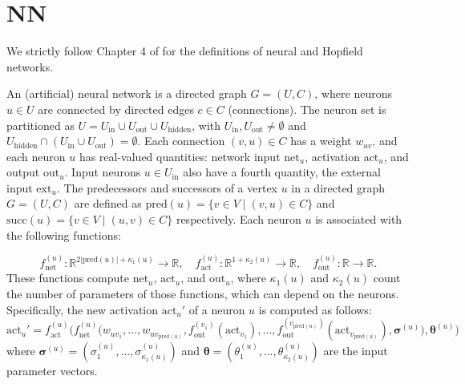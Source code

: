 \chapter{NN}

We strictly follow Chapter 4 of \cite{comp} for the definitions of neural and Hopfield networks.

\begin{definition}\label{NeuralNetwork}
An (artificial) neural network is a directed graph \( G = (U, C) \), where neurons \( u \in U \) 
are connected by directed edges \( c \in C \) (connections). 
The neuron set is partitioned as \( U = U_{\mathrm{in}} \cup U_{\mathrm{out}} \cup U_{\mathrm{hidden}} \), 
with \( U_{\mathrm{in}}, U_{\mathrm{out}} \neq \emptyset \) and \( U_{\mathrm{hidden}} \cap (U_{\mathrm{in}} 
\cup U_{\mathrm{out}}) = \emptyset \). Each connection \( (v, u) \in C \) has a weight \( w_{uv} \), and each neuron \( u \) 
has real-valued quantities: network input \( \mathrm{net}_u \), activation \( \mathrm{act}_u \), and output \( \mathrm{out}_u \).
Input neurons \( u \in U_{\mathrm{in}} \) also have a fourth quantity, the external input \( \mathrm{ext}_u \). 
The predecessors and successors of a vertex \( u \) in a directed graph \( G = (U, C) \) are defined as
$\mathrm{pred}(u) = \{ v \in V \mid (v, u) \in C \}$ and 
$\mathrm{succ}(u) = \{ v \in V \mid (u, v) \in C \}$ respectively. Each neuron \( u \) 
is associated with the following functions:  

$$f_{\mathrm{net}}^{(u)} : \mathbb{R}^{2|\mathrm{pred}(u)|+ \kappa_1 (u)} \to \mathbb{R}, \quad
 f_{\mathrm{act}}^{(u)} : \mathbb{R}^{1+\kappa_2 (u)} \to \mathbb{R}, \quad f_{\mathrm{out}}^{(u)} : \mathbb{R} \to \mathbb{R}. $$
 These functions compute \( \mathrm{net}_u \), \( \mathrm{act}_u \), and \( \mathrm{out}_u \), 
 where \( \kappa_1(u) \) and \( \kappa_2(u) \) count the number of parameters of those functions, 
 which can depend on the neurons. Specifically, the new activation $\mathrm{act}_u'$ of a neuron $u$ is computed as follows:
\begin{equation*}
\mathrm{act}_u'=  
f_{\mathrm{act}}^{(u)} \big(f_{\mathrm{net}}^{(u)} \big(
w_{uv_1}, \ldots, w_{uv_{\mathrm{pred}(u)}}, f_{\mathrm{out}}^{(v_1)}(\mathrm{act}_{v_1}),\ldots,
f_{\mathrm{out}}^{(v_{\mathrm{pred}(u)})}(\mathrm{act}_{v_{\mathrm{pred}(u)}}),
\boldsymbol{\sigma}^{(u)}\big), \boldsymbol{\theta}^{(u)}\big)
\end{equation*}
where $\boldsymbol{\sigma}^{(u)} = (\sigma_1^{(u)} , \ldots , 
\sigma_{\kappa_1(u)}^{(u)} )$ and $\boldsymbol{\theta} = (\theta_1^{(u)} , \ldots ,
 \theta_{\kappa_2(u)}^{(u)} )$ are the input parameter vectors.
\leanok
\end{definition}

